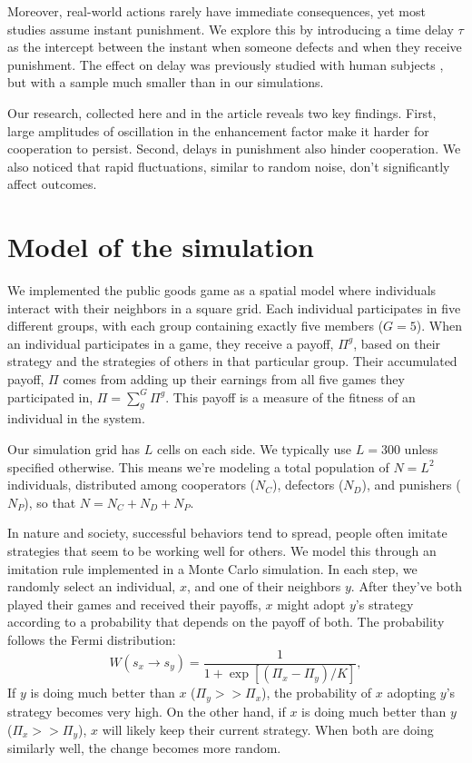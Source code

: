 Moreover, real-world actions rarely have immediate consequences, yet most studies assume instant punishment. We explore this by introducing a time delay $\tau$ as the intercept between the instant when someone defects and when they receive punishment. The effect on delay was previously studied with human subjects \cite{Late}, but with a sample much smaller than in our simulations.

Our research, collected here and in the article \cite{Alfaro2022} reveals two key findings. First, large amplitudes of oscillation in the enhancement factor make it harder for cooperation to persist. Second, delays in punishment also hinder cooperation. We also noticed that rapid fluctuations, similar to random noise, don't significantly affect outcomes.



\section{Model of the simulation}
\label{3model}




We implemented the public goods game as a spatial model where individuals interact with their neighbors in a square grid. Each individual participates in five different groups, with each group containing exactly five members ($G=5$). When an individual participates in a game, they receive a payoff, $\Pi^g$, based on their strategy and the strategies of others in that particular group. Their accumulated payoff, $\Pi$ comes from adding up their earnings from all five games they participated in, $\Pi=\sum_g^G \Pi^g$. This payoff is a measure of the fitness of an individual in the system.

Our simulation grid has $L$ cells on each side. We typically use $L=300$ unless specified otherwise. This means we're modeling a total population of $N=L^2$ individuals, distributed among cooperators ($N_C$), defectors ($N_D$), and punishers ($N_P$), so that $N=N_C+N_D+N_P$.

In nature and society, successful behaviors tend to spread, people often imitate strategies that seem to be working well for others. We model this through an imitation rule implemented in a Monte Carlo simulation. In each step, we randomly select an individual, $x$, and one of their neighbors $y$. After they've both played their games and received their payoffs, $x$ might adopt $y$'s strategy according to a probability that depends on the payoff of both. The probability follows the Fermi distribution:
\begin{equation}
W(s_x \rightarrow s_y)=\frac{1}{1+\exp[(\Pi_{x}-\Pi_{y})/K]},
\end{equation}
If $y$ is doing much better than $x$ ($\Pi_y >> \Pi_x$), the probability of $x$ adopting $y$'s strategy becomes very high. On the other hand, if $x$ is doing much better than $y$ ($\Pi_x >> \Pi_y$), $x$ will likely keep their current strategy. When both are doing similarly well, the change becomes more random.

